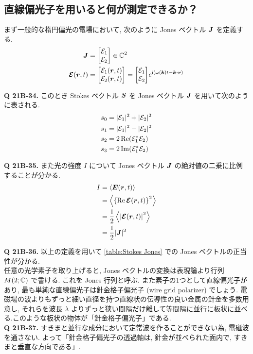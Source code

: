 \documentclass[uplatex,a4paper,dvipdfmx]{jsarticle}
\theoremstyle{definition}
\begin{document}
\subsection{直線偏光子を用いると何が測定できるか？}
まず一般的な楕円偏光の電場において, 次のように Jones ベクトル $\vb*{J}$ を定義する.
\begin{align}
  \JJ         & = \mqty[\Ec_1         \\ \Ec_2]\in\CC^2 \\
  \EC(\rr, t) & = \mqty[\Ec_1(\rr, t) \\ \Ec_2(\rr, t)] = \mqty[\Ec_1 \\ \Ec_2]e^{\ii(\omega(\kk)t - \kk\vdot\rr)}
\end{align}

\textbf{Q 21B-34.}
このとき Stokes ベクトル $\vb*{S}$ を Jones ベクトル $\vb*{J}$ を用いて次のように表される.
\begin{align}
  s_0 & = |\mathcal{E}_1|^2 + |\mathcal{E}_2|^2 \\
  s_1 & = |\mathcal{E}_1|^2 - |\mathcal{E}_2|^2 \\
  s_2 & = 2\Re(\mathcal{E}_1^*\mathcal{E}_2)    \\
  s_3 & = 2\Im(\mathcal{E}_1^*\mathcal{E}_2)
\end{align}

\textbf{Q 21B-35.}
また光の強度 $I$ について Jones ベクトル $\vb*{J}$ の絶対値の二乗に比例することが分かる.
\begin{align}
  I & = \left\langle\vb*{E}(\vb*{r}, t)\right\rangle                   \\
    & = \left\langle\qty{\Re\vb*{\mathcal{E}}(\vb*{r},t)}^2\right\rangle         \\
    & = \frac{1}{2}\left\langle\qty|\vb*{\mathcal{E}}(\vb*{r},t)|^2\right\rangle \\
    & = \frac{1}{2}|\vb*{J}|^2 \label{Jones strength}
\end{align}

\textbf{Q 21B-36.}
以上の定義を用いて \ref{table:Stokes Jones} での Jones ベクトルの正当性が分かる. \\

任意の光学素子を取り上げると, Jones ベクトルの変換は表現論より行列 $M(2; \mathbb{C})$ で書ける. これを Jones 行列と呼ぶ. また素子の1つとして直線偏光子があり, 最も単純な直線偏光子は針金格子偏光子 (wire grid polarizer) でしょう. 電磁場の波よりもずっと細い直径を持つ直線状の伝導性の良い金属の針金を多数用意し, それらを波長 $\lambda$ よりずっと狭い間隔だけ離して等間隔に並行に板状に並べる.このような板状の物体が「針金格子偏光子」である. \\

\textbf{Q 21B-37.}
すきまと並行な成分において定常波を作ることができない為, 電磁波を通さない. よって「針金格子偏光子の透過軸は, 針金が並べられた面内で, すきまと垂直な方向である」. \\
\end{document}
